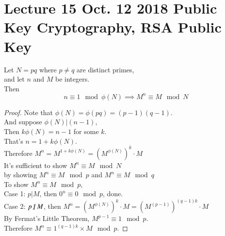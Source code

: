 \documentclass[10pt]{article}
\begin{document}
	\section{Lecture 15 Oct. 12 2018 Public Key Cryptography, RSA Public Key}
		\begin{lemma}
			Let $N = pq$ where $p \neq q$ are distinct primes, \\
			and let $n$ and $M$ be integers. \\
			Then 
			\[
				n \equiv 1 \mod \phi(N) \implies M^n \equiv M \mod N
			\]
		\end{lemma}
		\begin{proof}
			Note that $\phi(N) = \phi(pq) = (p-1)(q-1)$. \\
			And suppose $\phi(N) | (n-1)$, \\
			Then $k \phi(N) = n - 1$ for some $k$. \\
			That's $n = 1 + k \phi(N)$. \\
			Therefore $M^n = M^{1 + k \phi(N)} = (M^{\phi(N)})^k \cdot M $ \\
			It's sufficient to show $M^n \equiv M \mod N$\\
			by showing $M^n \equiv M \mod p$ and $M^n \equiv M \mod q$ \\
			To show $M^n \equiv M \mod p$, \\
			Case 1: $p | M$, then $0^n \equiv 0 \mod p$, done. \\
			Case 2: $p \centernot | M$, then $M^n = (M^{\phi(N)})^k \cdot M = (M^{(p-1)})^{(q-1)k} \cdot M$ \\
			By Fermat's Little Theorem, $M^{p-1} \equiv 1 \mod p$. \\
			Therefore $M^n \equiv 1^{(q-1)k} \times M \mod p$.
		\end{proof}
		
\end{document}
